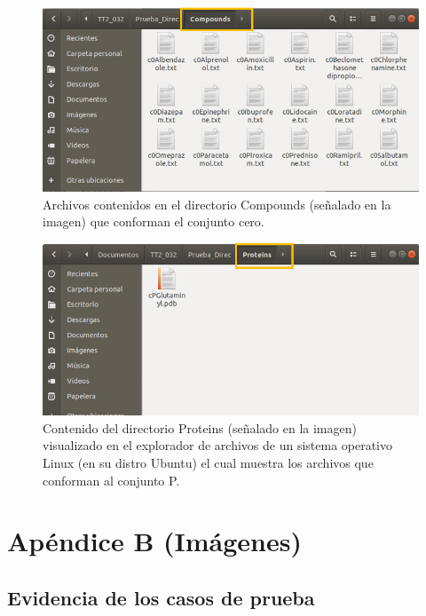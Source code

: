 \begin{figure}[H]
    \centering
    \includegraphics[scale=0.85]{Anexo/imagenes/figuraA-2-1.png}
    \caption{Archivos contenidos en el directorio Compounds (señalado en la imagen) que conforman el conjunto cero.}
    \label{A-2-1}
\end{figure}

\begin{figure}[H]
    \centering
    \includegraphics[scale=0.85]{Anexo/imagenes/figuraA-3-1.png}
    \caption{Contenido del directorio Proteins (señalado en la imagen) visualizado en el explorador de archivos de un sistema operativo Linux (en su distro Ubuntu) el cual muestra los archivos que conforman al conjunto P.}
    \label{A-3-1}
\end{figure}

\rhead{\newtitle}
\cfoot{\thepage}
\renewcommand{\headrulewidth}{1pt}
\renewcommand{\footrulewidth}{1pt}
\chapter*{Apéndice B (Imágenes)}

\section{Evidencia de los casos de prueba}


